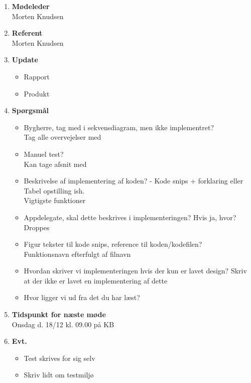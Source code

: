 	\begin{enumerate}
		\itemsep 0.3em 
		\item \textbf{Mødeleder}\\
			Morten Knudsen
		\item \textbf{Referent}\\
			Morten Knudsen

		\item \textbf{Update}
			\begin{itemize}[-]
				\item Rapport 
				\item Produkt
								
			\end{itemize}
					
		\item \textbf{Spørgsmål}
			\begin{itemize}[-]
				\item Bygherre, tag med i sekvensdiagram, men ikke implementret?\\
				Tag alle overvejelser med
				\item Manuel test? \\
				Kan tage afsnit med
				\item Beskrivelse af implementering af koden? - Kode snips + forklaring eller Tabel opstilling ish. \\
				Vigtigste funktioner
				\item Appdelegate, skal dette beskrives i implementeringen? Hvis ja, hvor? \\
				Droppes
				\item Figur tekster til kode snips, reference til koden/kodefilen? \\
				Funktionsnavn efterfulgt af filnavn
				\item Hvordan skriver vi implementeringen hvis der kun er lavet design?
				Skriv at der ikke er lavet en implementering af dette
				\item Hvor ligger vi ud fra det du har læst?	
			\end{itemize}
	
		\item \textbf{Tidspunkt for næste møde} \\
			Onsdag d. 18/12 kl. 09.00 på KB \\
						
		\item \textbf{Evt.}
			\begin{itemize}[-]
				\item Test skrives for sig selv
				\item Skriv lidt om testmiljø
				
			\end{itemize}
			
	\end{enumerate}

